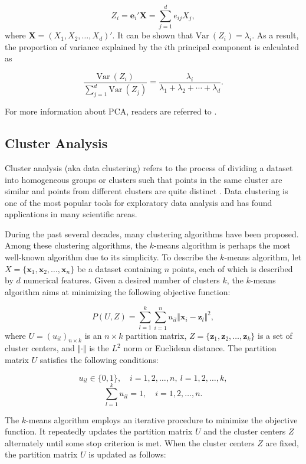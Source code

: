 \documentclass[]{book}
\theoremstyle{definition}
\theoremstyle{definition}
\theoremstyle{definition}
\theoremstyle{remark}
\begin{document}
\[Z_{i} = \textbf{e}_i' \textbf{X} =\sum_{j=1}^d e_{ij} X_j,\] where
\(\textbf{X}=(X_1,X_2,\ldots,X_d)'\). It can be shown that
\(\mathrm{Var~}{(Z_i)} = \lambda_i\). As a result, the proportion of
variance explained by the \(i\)th principal component is calculated as

\[\dfrac{\mathrm{Var~}{(Z_i)}}{ \sum_{j=1}^{d} \mathrm{Var~}{(Z_j)}} = \dfrac{\lambda_i}{\lambda_1+\lambda_2+\cdots+\lambda_d}.\]

For more information about PCA, readers are referred to
\citep{mirkin2011}.

\subsection{Cluster Analysis}\label{cluster-analysis}

Cluster analysis (aka data clustering) refers to the process of dividing
a dataset into homogeneous groups or clusters such that points in the
same cluster are similar and points from different clusters are quite
distinct \citep{gan2007, gan2011}. Data clustering is one of the most
popular tools for exploratory data analysis and has found applications
in many scientific areas.

During the past several decades, many clustering algorithms have been
proposed. Among these clustering algorithms, the \(k\)-means algorithm
is perhaps the most well-known algorithm due to its simplicity. To
describe the \(k\)-means algorithm, let
\(X=\{\textbf{x}_1,\textbf{x}_2,\ldots,\textbf{x}_n\}\) be a dataset
containing \(n\) points, each of which is described by \(d\) numerical
features. Given a desired number of clusters \(k\), the \(k\)-means
algorithm aims at minimizing the following objective function:

\[P(U,Z) = \sum_{l=1}^k\sum_{i=1}^n u_{il} \Vert \textbf{x}_i-\textbf{z}_l\Vert^2,\]
where \(U=(u_{il})_{n\times k}\) is an \(n\times k\) partition matrix,
\(Z=\{\textbf{z}_1,\textbf{z}_2,\ldots,\textbf{z}_k\}\) is a set of
cluster centers, and \(\Vert\cdot\Vert\) is the \(L^2\) norm or
Euclidean distance. The partition matrix \(U\) satisfies the following
conditions:

\[u_{il}\in \{0,1\},\quad i=1,2,\ldots,n,\:l=1,2,\ldots,k,\]
\[\sum_{l=1}^k u_{il}=1,\quad i=1,2,\ldots,n.\]

The \(k\)-means algorithm employs an iterative procedure to minimize the
objective function. It repeatedly updates the partition matrix \(U\) and
the cluster centers \(Z\) alternately until some stop criterion is met.
When the cluster centers \(Z\) are fixed, the partition matrix \(U\) is
updated as follows:
\end{document}
